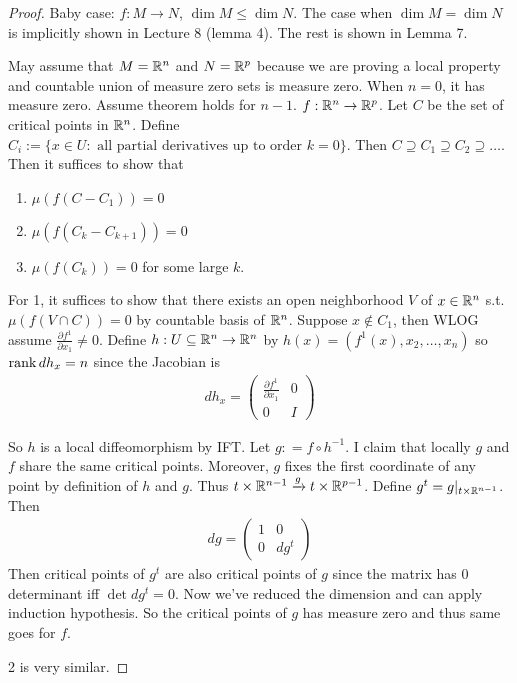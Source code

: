 \documentclass[12pt,class=article,crop=false]{standalone}
\begin{document}
\begin{proof}
Baby case: $ f: M \to N$, $ \dim M \leq \dim  N$. The case when $ \dim M = \dim N$ is implicitly shown in Lecture 8 (lemma 4). The rest is shown in Lemma 7.

May assume that $ M = \mathbb{R}^{n}$ and $ N = \mathbb{R}^{p}$ because we are proving a local property and countable union of measure zero sets is measure zero. When $ n=0$, it has measure zero. Assume theorem holds for $ n-1$. $ f: \mathbb{R}^{n} \to \mathbb{R}^{p}$. Let $ C$ be the set of critical points in  $ \mathbb{R}^{n}$. Define $ C_i := \{x \in U: \text{ all partial derivatives up to order }k =0  \} $. Then $ C \supseteq C_1 \supseteq C_2 \supseteq \ldots$. Then it suffices to show that
\begin{enumerate}[label=(\arabic*)]
	\item $ \mu(f(C-C_1)) = 0$
	\item $ \mu(f(C_k - C_{k+1})) = 0$ 
	\item $ \mu(f(C_k)) = 0$ for some large $ k$.
\end{enumerate}
For 1, it suffices to show that there exists an open neighborhood $ V$ of  $ x \in \mathbb{R}^{n}$ s.t.\ $ \mu(f(V \cap C)) = 0$ by countable basis of $ \mathbb{R}^{n}$. Suppose $ x \not\in  C_1$, then WLOG assume $ \frac{ \partial f^{1}}{ \partial x_1 }  \neq 0$. Define $ h : U \subseteq \mathbb{R}^{n} \to \mathbb{R}^{n}$ by $ h(x) = (f^{1}(x),x_2,\ldots,x_n)$ so $ \operatorname{rank} dh_x = n$ since the Jacobian is
 \begin{align*}
	dh_x = \begin{pmatrix} \frac{ \partial f^{1}}{ \partial x_1 } & 0\\ 0& I \end{pmatrix} 
\end{align*}

So $ h$ is a local diffeomorphism by IFT. Let $ g : = f \circ  h^{-1}$. I claim that locally $ g$ and  $ f$ share the same critical points. Moreover, $ g$ fixes the first coordinate of any point by definition of  $ h$ and  $ g$. Thus  $ t \times \mathbb{R}^{n-1} \xrightarrow{ g} t \times \mathbb{R}^{p-1} $. Define $ g^{t} = g|_{t \times \mathbb{R}^{n-1}}$. Then
\begin{align*}
	dg = \begin{pmatrix} 1&0\\ 0& dg^{t}\end{pmatrix} 
\end{align*}
Then critical points of $ g^{t}$ are also critical points of $ g$ since the matrix has 0 determinant iff  $ \det dg^{t} =0$. Now we've reduced the dimension and can apply induction hypothesis. So the critical points of $ g$ has measure zero and thus same goes for $ f$.

2 is very similar.


\end{proof}
\end{document}
